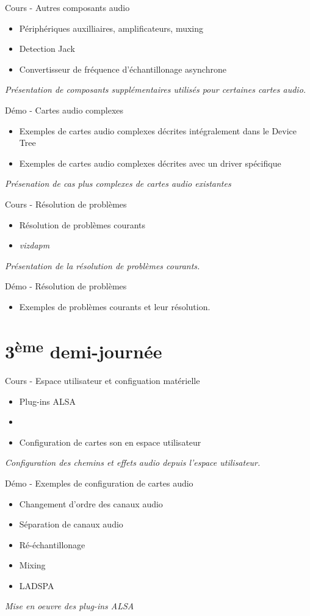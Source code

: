 \documentclass[a4paper,12pt,obeyspaces,spaces,hyphens]{article}
\begin{document}
\feagendatwocolumn
{Cours - Autres composants audio}
{
  \begin{itemize}
  \item Périphériques auxilliaires, amplificateurs, muxing
  \item Detection Jack
  \item Convertisseur de fréquence d'échantillonage asynchrone
  \end{itemize}
  \vspace{0.5em}
  {\em Présentation de composants supplémentaires utilisés pour certaines cartes audio.}
}
{Démo - Cartes audio complexes}
{
  \begin{itemize}
  \item Exemples de cartes audio complexes décrites intégralement dans le Device Tree
  \item Exemples de cartes audio complexes décrites avec un driver spécifique
  \end{itemize}
  \vspace{0.5em}
  {\em Présenation de cas plus complexes de cartes audio existantes}
}

\feagendatwocolumn
{Cours - Résolution de problèmes}
{
  \begin{itemize}
  \item Résolution de problèmes courants
  \item {\em vizdapm}
  \end{itemize}
  \vspace{0.5em}
  {\em Présentation de la résolution de problèmes courants.}
}
{Démo - Résolution de problèmes}
{
  \begin{itemize}
  \item Exemples de problèmes courants et leur résolution.
  \end{itemize}
}

\section{3\textsuperscript{ème} demi-journée}

\feagendatwocolumn
{Cours - Espace utilisateur et configuation matérielle}
{
  \begin{itemize}
  \item Plug-ins ALSA
  \item {}
  \item Configuration de cartes son en espace utilisateur
  \end{itemize}
  \vspace{0.5em}
  {\em Configuration des chemins et effets audio depuis l'espace utilisateur.}
}
{Démo - Exemples de configuration de cartes audio}
{
  \begin{itemize}
  \item Changement d'ordre des canaux audio
  \item Séparation de canaux audio
  \item Ré-échantillonage
  \item Mixing
  \item LADSPA
  \end{itemize}
  \vspace{0.5em}
  {\em Mise en oeuvre des plug-ins ALSA}
}
\end{document}
